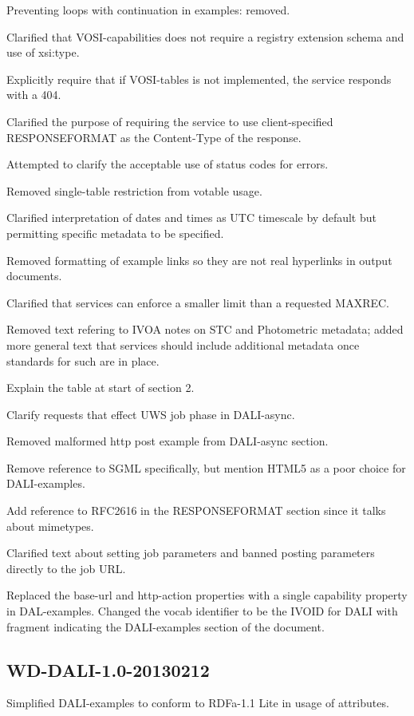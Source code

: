 \documentclass[11pt,letter]{ivoa}
\begin{document}
Preventing loops with continuation in examples: removed.

Clarified that VOSI-capabilities does not require a registry extension schema 
and use of xsi:type.

Explicitly require that if VOSI-tables is not implemented, the service responds 
with a 404.

Clarified the purpose of requiring the service to use client-specified 
RESPONSEFORMAT as the Content-Type of the response.

Attempted to clarify the acceptable use of status codes for errors.

Removed single-table restriction from votable usage.

Clarified interpretation of dates and times as UTC timescale by default but 
permitting specific metadata to be specified.

Removed formatting of example links so they are not real hyperlinks in output 
documents.

Clarified that services can enforce a smaller limit than a requested MAXREC.

Removed text refering to IVOA notes on STC and Photometric metadata; added more 
general text that services should include additional metadata once standards for 
such are in place.

Explain the table at start of section 2.

Clarify requests that effect UWS job phase in DALI-async.

Removed malformed http post example from DALI-async section.

Remove reference to SGML specifically, but mention HTML5 as a poor choice for 
DALI-examples.

Add reference to RFC2616 in the RESPONSEFORMAT section since it talks about 
mimetypes.

Clarified text about setting job parameters and banned posting parameters 
directly to the job URL.

Replaced the base-url and http-action properties with a single capability 
property in DAL-examples. Changed the vocab identifier to be the IVOID for DALI 
with fragment indicating the DALI-examples section of the document.

\subsection{WD-DALI-1.0-20130212}
Simplified DALI-examples to conform to RDFa-1.1 Lite in usage of attributes.


\end{document}
